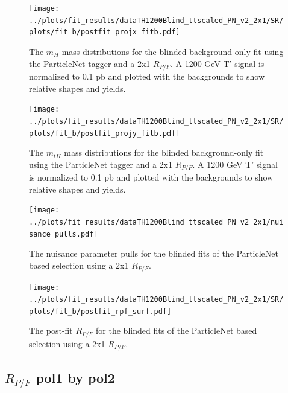 \documentclass[10pt,oneside]{article}
\begin{document}
\begin{figure}[H]
    \centering
    \texttt{[image: ../plots/fit\_results/dataTH1200Blind\_ttscaled\_PN\_v2\_2x1/SR/plots/fit\_b/postfit\_projx\_fitb.pdf]}
    \caption{The $m_H$ mass distributions for the blinded background-only fit using the ParticleNet tagger and a 2x1 $R_{P/F}$.
    A 1200 GeV T' signal is normalized to 0.1 pb and plotted with the backgrounds to show relative shapes and yields.}
    \label{figs:PN_mh_2x1}
\end{figure}
\begin{figure}[H]
    \centering
    \texttt{[image: ../plots/fit\_results/dataTH1200Blind\_ttscaled\_PN\_v2\_2x1/SR/plots/fit\_b/postfit\_projy\_fitb.pdf]}
    \caption{The $m_{tH}$ mass distributions for the blinded background-only fit using the ParticleNet tagger and a 2x1 $R_{P/F}$.
    A 1200 GeV T' signal is normalized to 0.1 pb and plotted with the backgrounds to show relative shapes and yields.}
    \label{figs:PN_mth_2x1}
\end{figure}
\begin{figure}[H]
    \centering
    \texttt{[image: ../plots/fit\_results/dataTH1200Blind\_ttscaled\_PN\_v2\_2x1/nuisance\_pulls.pdf]}
    \caption{The nuisance parameter pulls for the blinded fits of the ParticleNet based selection using a 2x1 $R_{P/F}$.}
    \label{figs:PN_nuis_2x1}
\end{figure}
\begin{figure}[H]
    \centering
    \texttt{[image: ../plots/fit\_results/dataTH1200Blind\_ttscaled\_PN\_v2\_2x1/SR/plots/fit\_b/postfit\_rpf\_surf.pdf]}
    \caption{The post-fit $R_{P/F}$ for the blinded fits of the ParticleNet based selection using a 2x1 $R_{P/F}$.}
    \label{figs:PN_rpf_2x1}
\end{figure}

\subsection{\texorpdfstring{$R_{P/F}$}{Rpf} pol1 by pol2}
\end{document}
